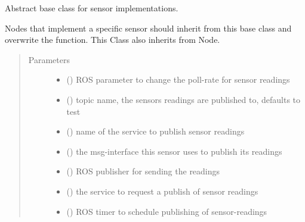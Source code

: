 \documentclass[a4paper,12pt,twoside]{article}
\begin{document}
\begin{fulllineitems}
\label{\detokenize{osbk_devices:osbk_devices.sensor_base.SensorBase}}
Abstract base class for sensor implementations.

Nodes that implement a specific sensor should inherit from this base class and overwrite the
 function. This Class also inherits from Node.
\begin{quote}\begin{description}
\item[{Parameters}] \leavevmode\begin{itemize}
\item {} 
 () \textendash{} ROS parameter to change the poll-rate for sensor readings

\item {} 
 () \textendash{} topic name, the sensors readings are published to,
defaults to  test

\item {} 
 () \textendash{} name of the service to publish sensor readings

\item {} 
 () \textendash{} the msg-interface this sensor uses to publish its
readings

\item {} 
 () \textendash{} ROS publisher for sending the readings

\item {} 
 () \textendash{} the service to request a publish of sensor readings

\item {} 
 () \textendash{} ROS timer to schedule publishing of sensor-readings


\end{itemize}
\end{description}
\end{quote}
\end{fulllineitems}
\end{document}
